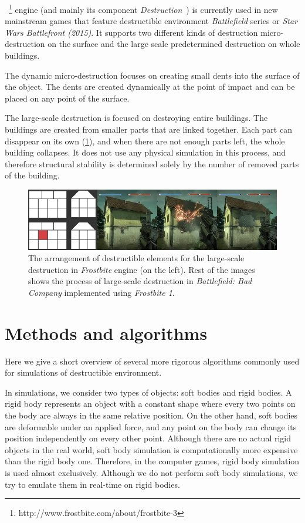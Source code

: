 ~\footnote{http://www.frostbite.com/about/frostbite-3} engine (and mainly its component \emph{Destruction}~\cite{destruction}) is currently used in new mainstream games that feature destructible environment \eg \emph{Battlefield} series or \emph{Star Wars Battlefront (2015)}. It supports two different kinds of destruction micro-destruction on the surface and the large scale predetermined destruction on whole buildings. 

The dynamic micro-destruction focuses on creating small dents into the surface of the object. The dents are created dynamically at the point of impact and can be placed on any point of the surface.

The large-scale destruction is focused on destroying entire buildings. The buildings are created from smaller parts that are linked together. Each part can disappear on its own (\cref{fig:frostbite}), and when there are not enough parts left, the whole building collapses. It does not use any physical simulation in this process, and therefore structural stability is determined solely by the number of removed parts of the building.

\begin{figure}
\centering
\includegraphics[width=\textwidth]{img/frostbite}
\caption{The arrangement of destructible elements for the large-scale destruction in \emph{Frostbite} engine (on the left). Rest of the images shows the process of large-scale destruction in \emph{Battlefield: Bad Company} implemented using \emph{Frostbite 1}.}
\label{fig:frostbite}
\end{figure}

\section{Methods and algorithms}

Here we give a short overview of several more rigorous algorithms commonly used for simulations of destructible environment. 

In simulations, we consider two types of objects: soft bodies and rigid bodies. A rigid body represents an object with a constant shape where every two points on the body are always in the same relative position. On the other hand, soft bodies are deformable under an applied force, and any point on the body can change its position independently on every other point. Although there are no actual rigid objects in the real world, soft body simulation is computationally more expensive than the rigid body one. Therefore, in the computer games, rigid body simulation is used almost exclusively. Although we do not perform soft body simulations, we try to emulate them in real-time on rigid bodies.

